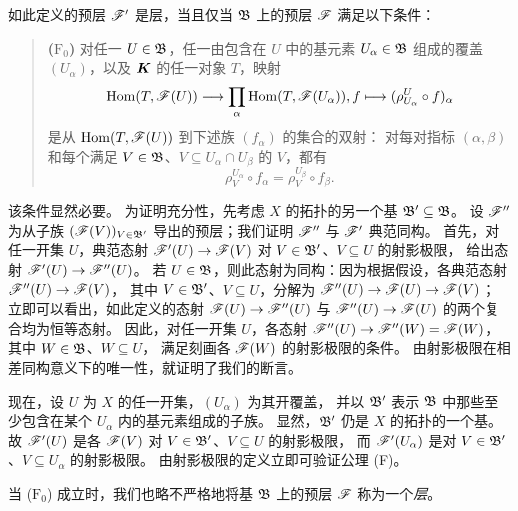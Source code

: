 如此定义的预层 $\mathscr F'$ 是层，当且仅当 $\mathfrak B$ 上的预层 $\mathscr F$ 满足以下条件：
\begin{quote}
\textbf{($\mathrm F_0$)} 对任一 $U\in\mathfrak B$，任一由包含在 $U$ 中的基元素 $U_\alpha\in\mathfrak B$
组成的覆盖 $(U_\alpha)$，以及 $\boldsymbol K$ 的任一对象 $T$，映射
\[
 \operatorname{Hom}(T,\mathscr F(U))\longrightarrow\prod_\alpha\operatorname{Hom}(T,\mathscr F(U_\alpha)),
  f\longmapsto(\rho_{U_\alpha}^U\circ f)_\alpha
\]
是从 $\operatorname{Hom}(T,\mathscr F(U))$ 到下述族 $(f_\alpha)$ 的集合的双射：
对每对指标 $(\alpha,\beta)$ 和每个满足 $V\in\mathfrak B$、$V\subseteq U_\alpha\cap U_\beta$ 的 $V$，都有
\[
 \rho_V^{U_\alpha}\circ f_\alpha
 =\rho_V^{U_\beta}\circ f_\beta.
\]
\end{quote}

该条件显然必要。
为证明充分性，先考虑 $X$ 的拓扑的另一个基 $\mathfrak B'\subseteq\mathfrak B$。
设 $\mathscr F''$ 为从子族 $(\mathscr F(V))_{V\in\mathfrak B'}$ 导出的预层；我们证明 $\mathscr F''$ 与 $\mathscr F'$ 典范同构。
首先，对任一开集 $U$，典范态射 $\mathscr F'(U)\to\mathscr F(V)$ 对 $V\in\mathfrak B'$、$V\subseteq U$ 的射影极限，
给出态射 $\mathscr F'(U)\to\mathscr F''(U)$。
若 $U\in\mathfrak B$，则此态射为同构：因为根据假设，各典范态射 $\mathscr F''(U)\to\mathscr F(V)$，
其中 $V\in\mathfrak B'$、$V\subseteq U$，分解为
$\mathscr F''(U)\to\mathscr F(U)\to\mathscr F(V)$；
立即可以看出，如此定义的态射 $\mathscr F(U)\to\mathscr F''(U)$ 与 $\mathscr F''(U)\to\mathscr F(U)$ 的两个复合均为恒等态射。
因此，对任一开集 $U$，各态射 $\mathscr F''(U)\to\mathscr F''(W)=\mathscr F(W)$，其中 $W\in\mathfrak B$、$W\subseteq U$，
满足刻画各 $\mathscr F(W)$ 的射影极限的条件。
由射影极限在相差同构意义下的唯一性，就证明了我们的断言。

现在，设 $U$ 为 $X$ 的任一开集，$(U_\alpha)$ 为其开覆盖，
并以 $\mathfrak B'$ 表示 $\mathfrak B$ 中那些至少包含在某个 $U_\alpha$ 内的基元素组成的子族。
显然，$\mathfrak B'$ 仍是 $X$ 的拓扑的一个基。
故 $\mathscr F'(U)$ 是各 $\mathscr F(V)$ 对 $V\in\mathfrak B'$、$V\subseteq U$ 的射影极限，
而 $\mathscr F'(U_\alpha)$ 是对 $V\in\mathfrak B'$、$V\subseteq U_\alpha$ 的射影极限。
由射影极限的定义立即可验证公理 (F)。

当 ($\mathrm F_0$) 成立时，我们也略不严格地将基 $\mathfrak B$ 上的预层 $\mathscr F$ 称为一个\emph{层}。

